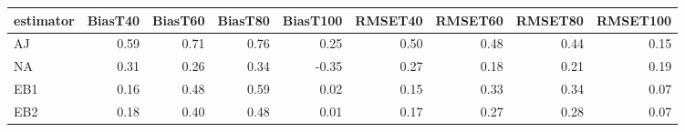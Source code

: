 \begin{table}[ht]
\centering
\begin{tabular}{lrrrrrrrr}
  \toprule
estimator & BiasT40 & BiasT60 & BiasT80 & BiasT100 & RMSET40 & RMSET60 & RMSET80 & RMSET100 \\ 
  \midrule
AJ & 0.59 & 0.71 & 0.76 & 0.25 & 0.50 & 0.48 & 0.44 & 0.15 \\ 
  NA & 0.31 & 0.26 & 0.34 & -0.35 & 0.27 & 0.18 & 0.21 & 0.19 \\ 
  EB1 & 0.16 & 0.48 & 0.59 & 0.02 & 0.15 & 0.33 & 0.34 & 0.07 \\ 
  EB2 & 0.18 & 0.40 & 0.48 & 0.01 & 0.17 & 0.27 & 0.28 & 0.07 \\ 
   \bottomrule
\end{tabular}
\end{table}
